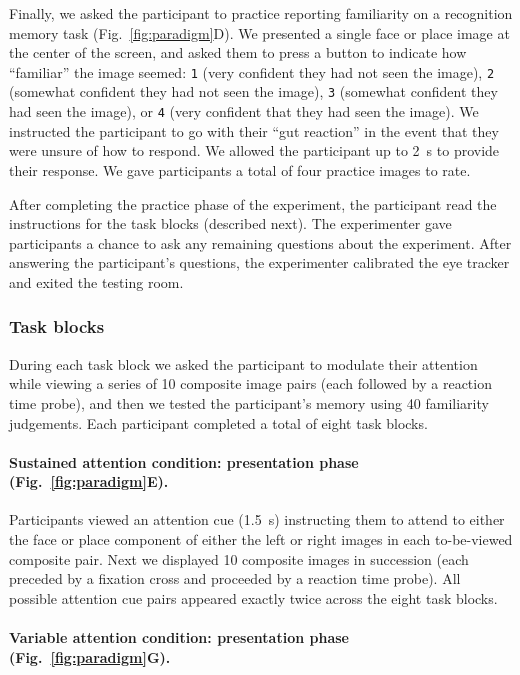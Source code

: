 \documentclass[english]{article}
\begin{document}
Finally, we asked the participant to practice reporting familiarity on a
recognition memory task (Fig.~\ref{fig:paradigm}D). We presented a single face
or place image at the center of the screen, and asked them to press a button to
indicate how ``familiar'' the image seemed: \texttt{1} (very confident they had
not seen the image), \texttt{2} (somewhat confident they had not seen the
image), \texttt{3} (somewhat confident they had seen the image), or \texttt{4}
(very confident that they had seen the image). We instructed the participant to
go with their ``gut reaction'' in the event that they were unsure of how to
respond. We allowed the participant up to 2~s to provide their response. We
gave participants a total of four practice images to rate.

After completing the practice phase of the experiment, the participant read the
instructions for the task blocks (described next). The experimenter gave
participants a chance to ask any remaining questions about the experiment.
After answering the participant's questions, the experimenter calibrated the
eye tracker and exited the testing room.

\subsubsection*{Task blocks}

During each task block we asked the participant to modulate their attention
while viewing a series of 10 composite image pairs (each followed by a reaction
time probe), and then we tested the participant's memory using 40 familiarity
judgements. Each participant completed a total of eight task blocks.

\paragraph*{Sustained attention condition: presentation phase
(Fig.~\ref{fig:paradigm}E).}

Participants viewed an attention cue (1.5~s) instructing them to attend to
either the face or place component of either the left or right images in each
to-be-viewed composite pair. Next we displayed 10 composite images in
succession (each preceded by a fixation cross and proceeded by a reaction time
probe). All possible attention cue pairs appeared exactly twice across the
eight task blocks.

\paragraph*{Variable attention condition: presentation phase
(Fig.~\ref{fig:paradigm}G).}
\end{document}

